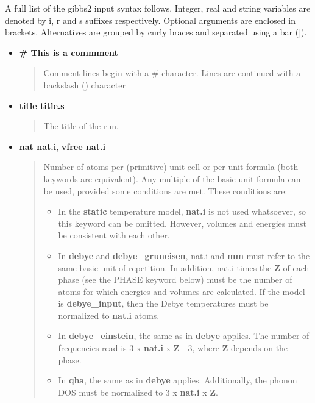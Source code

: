\documentclass[a4paper]{article}
\begin{document}
A full list of the gibbs2 input syntax follows. Integer, real and
string variables are denoted by i, r and s suffixes
respectively. Optional arguments are enclosed in
brackets. Alternatives are grouped by curly braces and separated using
a bar (|).

\begin{itemize}
\item \textbf{\# This is a commment}

\begin{quote}
Comment lines begin with a \# character. Lines are continued with a
backslash () character
\end{quote}

\item \textbf{title title.s}

\begin{quote}
The title of the run.
\end{quote}

\item \textbf{nat nat.i}, \textbf{vfree nat.i}

\begin{quote}
Number of atoms per (primitive) unit cell or per unit formula (both
keywords are equivalent). Any multiple of the basic unit formula
can be used, provided some conditions are met. These conditions
are:

\begin{itemize}
\item In the \textbf{static} temperature model, \textbf{nat.i} is not used
whatsoever, so this keyword can be omitted. However, volumes and
energies must be consistent with each other.

\item In \textbf{debye} and \textbf{debye\_gruneisen}, nat.i and \textbf{mm} must
refer to the same basic unit of repetition. In addition,
nat.i times the \textbf{Z} of each phase (see the PHASE keyword
below) must be the number of atoms for which energies and volumes
are calculated. If the model is \textbf{debye\_input}, then the Debye
temperatures must be normalized to \textbf{nat.i} atoms.

\item In \textbf{debye\_einstein}, the same as in \textbf{debye} applies. The
number of frequencies read is 3 x \textbf{nat.i} x \textbf{Z} - 3, where
\textbf{Z} depends on the phase.

\item In \textbf{qha}, the same as in \textbf{debye} applies. Additionally, the
phonon DOS must be normalized to 3 x \textbf{nat.i} x \textbf{Z}.


\end{itemize}
\end{quote}
\end{itemize}
\end{document}
